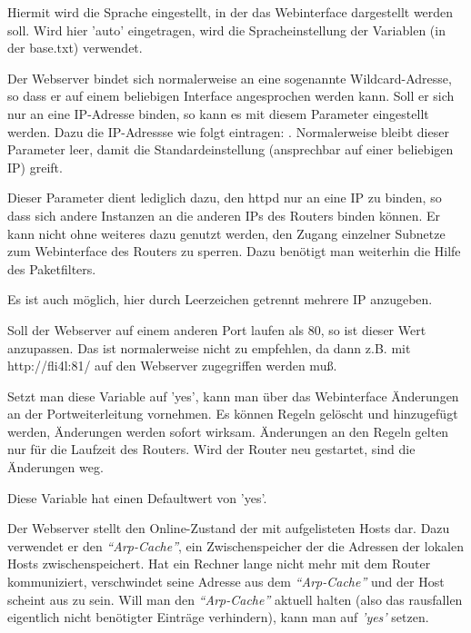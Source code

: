 \begin{description}


    {Hiermit wird die Sprache eingestellt, in der das Webinterface
    dargestellt werden soll. Wird hier 'auto' eingetragen, wird die 
    Spracheinstellung der Variablen  (in der base.txt) 
    verwendet.}


Der Webserver bindet sich normalerweise an eine sogenannte
Wildcard-Adresse, so dass er auf einem beliebigen Interface
angesprochen werden kann. Soll er sich nur an eine IP-Adresse binden,
so kann es mit diesem Parameter eingestellt werden. Dazu die
IP-Adressse wie folgt eintragen: .  Normalerweise
bleibt dieser Parameter leer, damit die Standardeinstellung
(ansprechbar auf einer beliebigen IP) greift.

Dieser Parameter dient lediglich dazu, den httpd nur an eine IP zu
binden, so dass sich andere Instanzen an die anderen IPs des Routers
binden können. Er kann nicht ohne weiteres dazu genutzt werden, den
Zugang einzelner Subnetze zum Webinterface des Routers zu
sperren. Dazu benötigt man weiterhin die Hilfe des Paketfilters.

Es ist auch möglich, hier durch Leerzeichen getrennt mehrere IP anzugeben.


    {Soll der Webserver auf einem anderen Port laufen als 80, so ist
    dieser Wert anzupassen. Das ist normalerweise nicht zu empfehlen, da
    dann z.B. mit http://fli4l:81/ auf den Webserver zugegriffen werden
    muß.}

 { Setzt man diese
  Variable auf 'yes', kann man über das Webinterface Änderungen an der
  Portweiterleitung vornehmen. Es können Regeln gelöscht und
  hinzugefügt werden, Änderungen werden sofort wirksam. Änderungen an
  den Regeln gelten nur für die Laufzeit des Routers. Wird der Router
  neu gestartet, sind die Änderungen weg. 

  Diese Variable hat einen Defaultwert von 'yes'.}

 { Der Webserver
  stellt den Online-Zustand der mit  aufgelisteten Hosts
  dar. Dazu verwendet er den \emph{``Arp-Cache''}, ein Zwischenspeicher
  der die Adressen der lokalen Hosts zwischenspeichert. Hat ein
  Rechner lange nicht mehr mit dem Router kommuniziert, verschwindet
  seine Adresse aus dem \emph{``Arp-Cache''} und der Host scheint aus
  zu sein. Will man den \emph{``Arp-Cache''} aktuell halten (also das
  rausfallen eigentlich nicht benötigter Einträge verhindern), kann
  man  auf \emph{'yes'} setzen.}
  

\end{description}
